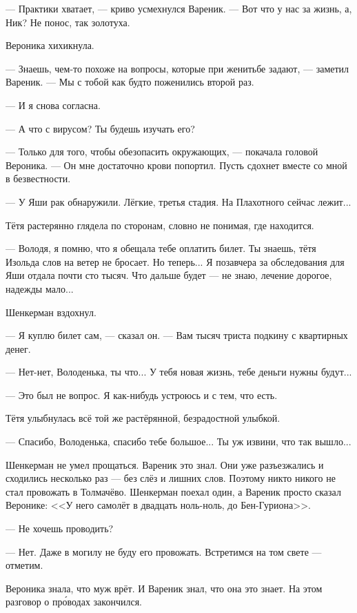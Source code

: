 --- Практики хватает, --- криво усмехнулся Вареник.
--- Вот что у нас за жизнь, а, Ник?
Не понос, так золотуха.

Вероника хихикнула.

--- Знаешь, чем-то похоже на вопросы, которые при женитьбе задают, --- заметил Вареник.
--- Мы с тобой как будто поженились второй раз.

--- И я снова согласна.

--- А что с вирусом?
Ты будешь изучать его?

--- Только для того, чтобы обезопасить окружающих, --- покачала головой Вероника.
--- Он мне достаточно крови попортил.
Пусть сдохнет вместе со мной в безвестности.

\asterism

\textspace

--- У Яши рак обнаружили.
Лёгкие, третья стадия.
На Плахотного сейчас лежит...

Тётя растерянно глядела по сторонам, словно не понимая, где находится.

--- Володя, я помню, что я обещала тебе оплатить билет.
Ты знаешь, тётя Изольда слов на ветер не бросает.
Но теперь...
Я позавчера за обследования для Яши отдала почти сто тысяч.
Что дальше будет --- не знаю, лечение дорогое, надежды мало...

Шенкерман вздохнул.

--- Я куплю билет сам, --- сказал он.
--- Вам тысяч триста подкину с квартирных денег.

--- Нет-нет, Володенька, ты что...
У тебя новая жизнь, тебе деньги нужны будут...

--- Это был не вопрос.
Я как-нибудь устроюсь и с тем, что есть.

Тётя улыбнулась всё той же растёрянной, безрадостной улыбкой.

--- Спасибо, Володенька, спасибо тебе большое...
Ты уж извини, что так вышло...

\asterism

Шенкерман не умел прощаться.
Вареник это знал.
Они уже разъезжались и сходились несколько раз --- без слёз и лишних слов.
Поэтому никто никого не стал провожать в Толмачёво.
Шенкерман поехал один, а Вареник просто сказал Веронике:
<<У него самолёт в двадцать ноль-ноль, до Бен-Гуриона>>.

--- Не хочешь проводить?

--- Нет.
Даже в могилу не буду его провожать.
Встретимся на том свете --- отметим.

Вероника знала, что муж врёт.
И Вареник знал, что она это знает.
На этом разговор о пр\'оводах закончился.

